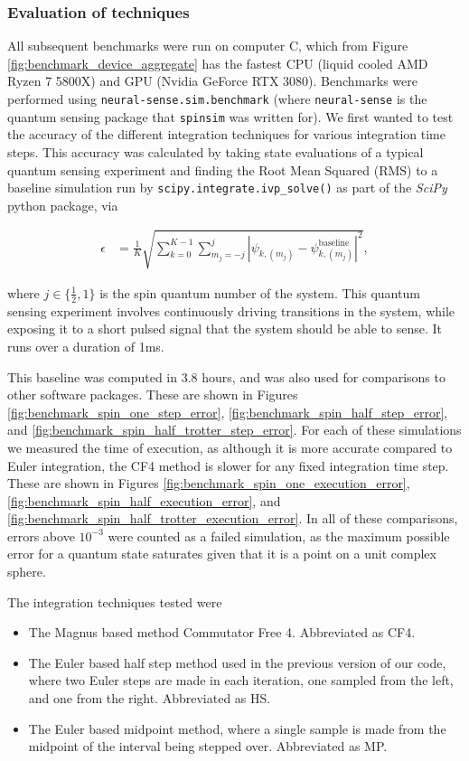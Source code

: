 \documentclass{jors}
\begin{document}
		\subsubsection*{Evaluation of techniques}
		All subsequent benchmarks were run on computer C, which from Figure \ref{fig:benchmark_device_aggregate} has the fastest CPU (liquid cooled AMD Ryzen 7 5800X) and GPU (Nvidia GeForce RTX 3080). Benchmarks were performed using \texttt{neural-sense.sim.benchmark} (where \texttt{neural-sense} \cite{alexander-tritt-monash_alexander-tritt-monashneural-sense_2020} is the quantum sensing package that \texttt{spinsim} was written for). We first wanted to test the accuracy of the different integration techniques for various integration time steps. This accuracy was calculated by taking state evaluations of a typical quantum sensing experiment and finding the Root Mean Squared (RMS) to a baseline simulation run by \texttt{scipy.integrate.ivp\_solve()} as part of the \emph{SciPy} python package, via

			\begin{align}
                \epsilon &= \frac{1}{K}\sqrt{\sum_{k = 0}^{K - 1}\sum_{m_j = -j}^j|\psi_{k, (m_j)} - \psi_{k, (m_j)}^{\textrm{baseline}}|^2},\label{eq:error}
            \end{align}

			where \(j \in \{\frac12, 1\}\) is the spin quantum number of the system. This quantum sensing experiment involves continuously driving transitions in the system, while exposing it to a short pulsed signal that the system should be able to sense. It runs over a duration of 1ms.

			This baseline was computed in 3.8 hours, and was also used for comparisons to other software packages. These are shown in Figures \ref{fig:benchmark_spin_one_step_error}, \ref{fig:benchmark_spin_half_step_error}, and \ref{fig:benchmark_spin_half_trotter_step_error}. For each of these simulations we measured the time of execution, as although it is more accurate compared to Euler integration, the CF4 method is slower for any fixed integration time step. These are shown in Figures \ref{fig:benchmark_spin_one_execution_error}, \ref{fig:benchmark_spin_half_execution_error}, and \ref{fig:benchmark_spin_half_trotter_execution_error}. In all of these comparisons, errors above \(10^{-3}\) were counted as a failed simulation, as the maximum possible error for a quantum state saturates given that it is a point on a unit complex sphere.

			The integration techniques tested were
			\begin{itemize}
				\item The Magnus based method Commutator Free 4. Abbreviated as CF4.
				\item The Euler based half step method used in the previous version of our code, where two Euler steps are made in each iteration, one sampled from the left, and one from the right. Abbreviated as HS.
				\item The Euler based midpoint method, where a single sample is made from the midpoint of the interval being stepped over. Abbreviated as MP.
			\end{itemize}
\end{document}
